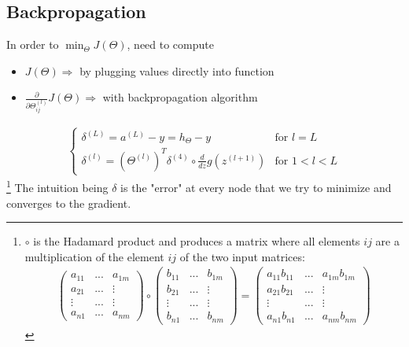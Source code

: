 \documentclass[a4paper,titlepage] {scrartcl}
\begin{document}
\subsection{Backpropagation} %
\label{sub:backpropagation}
In order to $\min_{\Theta} J(\Theta)$, need to compute
\begin{itemize}
	\item $J(\Theta) \Rightarrow$ by plugging values directly into function
	\item $\frac{\partial}{\partial \Theta_{ij}^{(l)}}J(\Theta) \Rightarrow$ with backpropagation algorithm
\end{itemize}


\begin{eqnarray}
	\begin{cases}
		\delta^{(L)} = a^{(L)} - y =  h_\Theta - y & \text{for }l=L\\ 
		\delta^{(l)} = (\Theta^{(l)})^T\delta^{(4)} \circ \frac{d}{dz}g(z^{(l+1)}) & \text{for }1<l<L
	\end{cases}
\end{eqnarray}\footnote{$\circ$ is the Hadamard product and produces  a matrix where all elements $ij$ are a multiplication of the element $ij$ of the two input matrices:
\begin{eqnarray}
	\begin{pmatrix}
		a_{11} &  ... & a_{1m}\\
		a_{21} & ... & \vdots\\
		\vdots & ... & \vdots\\
		a_{n1} & ... & a_{nm}
	\end{pmatrix}
	\circ
	\begin{pmatrix}
		b_{11} &  ... & b_{1m}\\
		b_{21} & ... & \vdots\\
		\vdots & ... & \vdots\\
		b_{n1} & ... & b_{nm}
	\end{pmatrix}
	=
	\begin{pmatrix}
		a_{11}b_{11} &  ... & a_{1m}b_{1m}\\
		a_{21}b_{21} & ... & \vdots\\
		\vdots & ... & \vdots\\
		a_{n1}b_{n1} & ... & a_{nm}b_{nm}
	\end{pmatrix}
\end{eqnarray}} 
The intuition being $\delta$ is the "error" at every node that we try to minimize and converges to the gradient.
\end{document}

